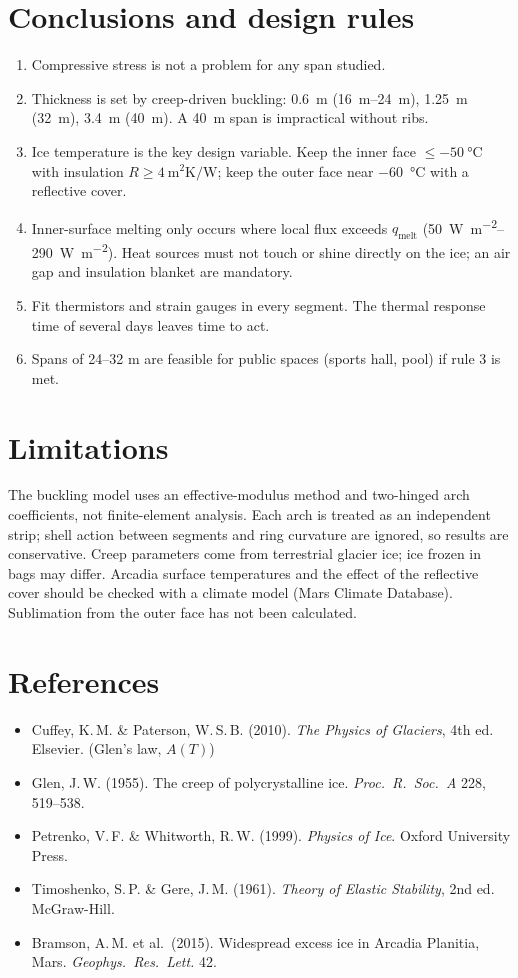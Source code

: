 \documentclass[11pt,a4paper]{article}
\begin{document}
\section{Conclusions and design rules}
\begin{enumerate}
\item Compressive stress is not a problem for any span studied.
\item Thickness is set by creep-driven buckling: \SI{0.6}{\metre} (\SIrange{16}{24}{\metre}), \SI{1.25}{\metre} (\SI{32}{\metre}), \SI{3.4}{\metre} (\SI{40}{\metre}). A \SI{40}{\metre} span is impractical without ribs.
\item Ice temperature is the key design variable. Keep the inner face $\le\SI{-50}{\celsius}$ with insulation $R\ge\SI{4}{\metre\squared\kelvin\per\watt}$; keep the outer face near \SI{-60}{\celsius} with a reflective cover.
\item Inner-surface melting only occurs where local flux exceeds $q_{\text{melt}}$ (\SIrange{50}{290}{\watt\per\metre\squared}). Heat sources must not touch or shine directly on the ice; an air gap and insulation blanket are mandatory.
\item Fit thermistors and strain gauges in every segment. The thermal response time of several days leaves time to act.
\item Spans of 24--32 m are feasible for public spaces (sports hall, pool) if rule 3 is met.
\end{enumerate}

\section{Limitations}
The buckling model uses an effective-modulus method and two-hinged arch coefficients, not finite-element analysis. Each arch is treated as an independent strip; shell action between segments and ring curvature are ignored, so results are conservative. Creep parameters come from terrestrial glacier ice; ice frozen in bags may differ. Arcadia surface temperatures and the effect of the reflective cover should be checked with a climate model (Mars Climate Database). Sublimation from the outer face has not been calculated.

\section*{References}
\begin{itemize}
\item Cuffey, K.\,M. \& Paterson, W.\,S.\,B. (2010). \emph{The Physics of Glaciers}, 4th ed. Elsevier. (Glen's law, $A(T)$)
\item Glen, J.\,W. (1955). The creep of polycrystalline ice. \emph{Proc.\ R.\ Soc.\ A} 228, 519--538.
\item Petrenko, V.\,F. \& Whitworth, R.\,W. (1999). \emph{Physics of Ice}. Oxford University Press.
\item Timoshenko, S.\,P. \& Gere, J.\,M. (1961). \emph{Theory of Elastic Stability}, 2nd ed. McGraw-Hill.
\item Bramson, A.\,M. et al.\ (2015). Widespread excess ice in Arcadia Planitia, Mars. \emph{Geophys.\ Res.\ Lett.} 42.
\end{itemize}
\end{document}

